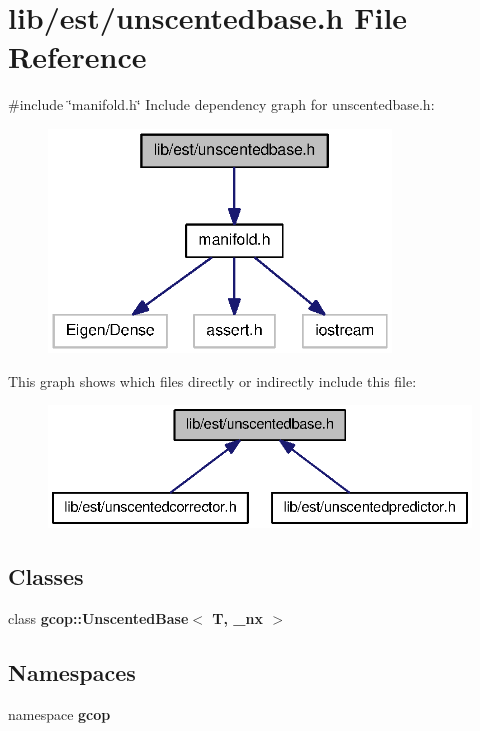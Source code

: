 \section{lib/est/unscentedbase.h \-File \-Reference}
\label{unscentedbase_8h}
{\ttfamily \#include \char`\"{}manifold.\-h\char`\"{}}\*
\-Include dependency graph for unscentedbase.\-h\-:\nopagebreak
\begin{figure}[H]
\begin{center}
\leavevmode
\includegraphics[width=258pt]{unscentedbase_8h__incl}
\end{center}
\end{figure}
\-This graph shows which files directly or indirectly include this file\-:\nopagebreak
\begin{figure}[H]
\begin{center}
\leavevmode
\includegraphics[width=334pt]{unscentedbase_8h__dep__incl}
\end{center}
\end{figure}
\subsection*{\-Classes}
\begin{DoxyCompactItemize}
\item 
class {\bf gcop\-::\-Unscented\-Base$<$ T, \-\_\-nx $>$}
\end{DoxyCompactItemize}
\subsection*{\-Namespaces}
\begin{DoxyCompactItemize}
\item 
namespace {\bf gcop}
\end{DoxyCompactItemize}
